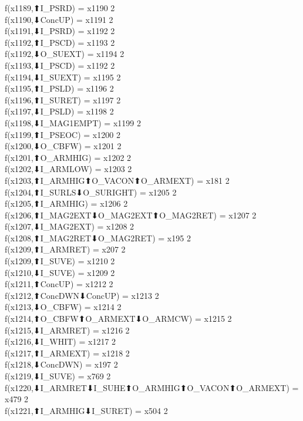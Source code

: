 f(x1189,⬆I_PSRD) = x1190 {2} \\
f(x1190,⬇ConcUP) = x1191 {2} \\
f(x1191,⬇I_PSRD) = x1192 {2} \\
f(x1192,⬆I_PSCD) = x1193 {2} \\
f(x1192,⬇O_SUEXT) = x1194 {2} \\
f(x1193,⬇I_PSCD) = x1192 {2} \\
f(x1194,⬇I_SUEXT) = x1195 {2} \\
f(x1195,⬆I_PSLD) = x1196 {2} \\
f(x1196,⬆I_SURET) = x1197 {2} \\
f(x1197,⬇I_PSLD) = x1198 {2} \\
f(x1198,⬇I_MAG1EMPT) = x1199 {2} \\
f(x1199,⬆I_PSEOC) = x1200 {2} \\
f(x1200,⬇O_CBFW) = x1201 {2} \\
f(x1201,⬆O_ARMHIG) = x1202 {2} \\
f(x1202,⬇I_ARMLOW) = x1203 {2} \\
f(x1203,⬆I_ARMHIG⬆O_VACON⬆O_ARMEXT) = x181 {2} \\
f(x1204,⬆I_SURLS⬇O_SURIGHT) = x1205 {2} \\
f(x1205,⬆I_ARMHIG) = x1206 {2} \\
f(x1206,⬆I_MAG2EXT⬇O_MAG2EXT⬆O_MAG2RET) = x1207 {2} \\
f(x1207,⬇I_MAG2EXT) = x1208 {2} \\
f(x1208,⬆I_MAG2RET⬇O_MAG2RET) = x195 {2} \\
f(x1209,⬆I_ARMRET) = x207 {2} \\
f(x1209,⬆I_SUVE) = x1210 {2} \\
f(x1210,⬇I_SUVE) = x1209 {2} \\
f(x1211,⬆ConcUP) = x1212 {2} \\
f(x1212,⬆ConcDWN⬇ConcUP) = x1213 {2} \\
f(x1213,⬇O_CBFW) = x1214 {2} \\
f(x1214,⬆O_CBFW⬆O_ARMEXT⬇O_ARMCW) = x1215 {2} \\
f(x1215,⬇I_ARMRET) = x1216 {2} \\
f(x1216,⬇I_WHIT) = x1217 {2} \\
f(x1217,⬆I_ARMEXT) = x1218 {2} \\
f(x1218,⬇ConcDWN) = x197 {2} \\
f(x1219,⬇I_SUVE) = x769 {2} \\
f(x1220,⬇I_ARMRET⬇I_SUHE⬆O_ARMHIG⬆O_VACON⬆O_ARMEXT) = x479 {2} \\
f(x1221,⬆I_ARMHIG⬇I_SURET) = x504 {2} \\
